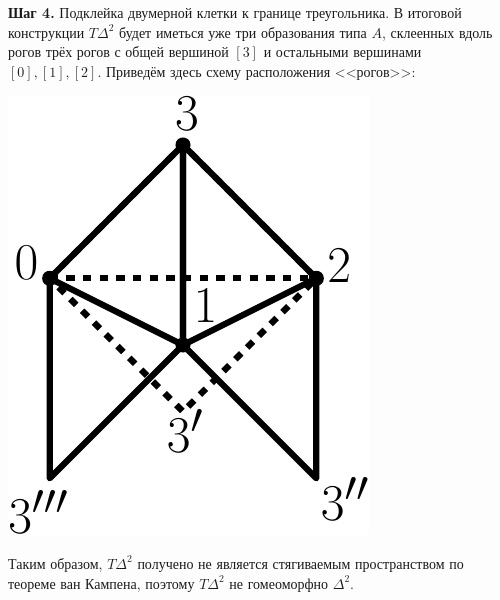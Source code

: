 \documentclass[14pt, dvipsnames]{extarticle}
\theoremstyle{definition}
\theoremstyle{remark}
\begin{document}
{\bf Шаг 4.} Подклейка двумерной клетки к границе треугольника. В итоговой конструкции $T\Delta^2$ будет иметься уже три образования типа $A$, склеенных вдоль рогов трёх рогов с общей вершиной $[3]$ и остальными вершинами $[0], [1], [2]$. Приведём здесь схему расположения <<рогов>>:


\begin{center}
\includegraphics[scale=0.5]{pict7}
\end{center}
 
 
Таким образом, $T\Delta^2$ получено не является стягиваемым пространством по теореме ван Кампена, поэтому $T\Delta^2$ не гомеоморфно $\Delta^2$.
\end{document}
